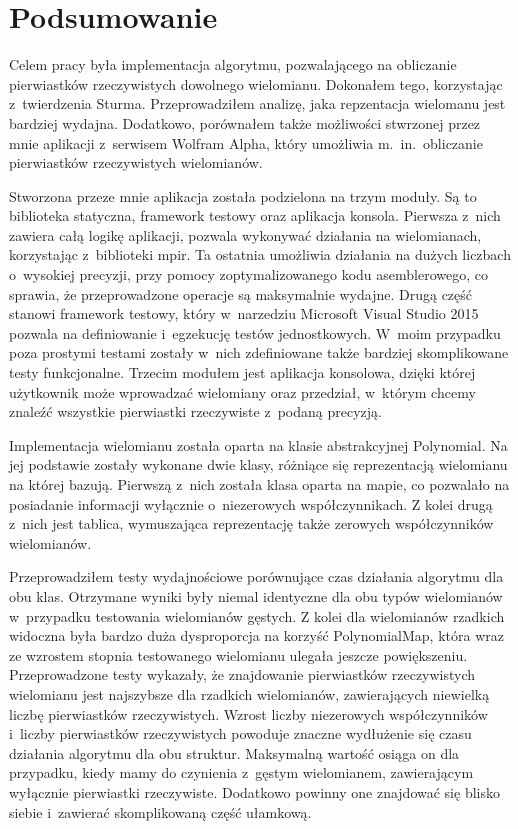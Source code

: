 \chapter{Podsumowanie}

Celem pracy była implementacja algorytmu, pozwalającego na obliczanie pierwiastków rzeczywistych dowolnego wielomianu. Dokonałem tego, korzystając z~twierdzenia Sturma. Przeprowadziłem analizę, jaka repzentacja wielomanu jest bardziej wydajna. Dodatkowo, porównałem także możliwości stwrzonej przez mnie aplikacji z~serwisem Wolfram Alpha, który umożliwia m.\ in.\ obliczanie pierwiastków rzeczywistych wielomianów.

Stworzona przeze mnie aplikacja została podzielona na trzym moduły. Są to biblioteka statyczna, framework testowy oraz aplikacja konsola. Pierwsza z~nich zawiera całą logikę aplikacji, pozwala wykonywać działania na wielomianach, korzystając z~biblioteki mpir. Ta ostatnia umożliwia działania na dużych liczbach o~wysokiej precyzji, przy pomocy zoptymalizowanego kodu asemblerowego, co sprawia, że przeprowadzone operacje są maksymalnie wydajne. Drugą część stanowi framework testowy, który w~narzedziu Microsoft Visual Studio 2015 pozwala na definiowanie i~egzekucję testów jednostkowych. W~moim przypadku poza prostymi testami zostały w~nich zdefiniowane także bardziej skomplikowane testy funkcjonalne. Trzecim modułem jest aplikacja konsolowa, dzięki której użytkownik może wprowadzać wielomiany oraz przedział, w~którym chcemy znaleźć wszystkie pierwiastki rzeczywiste z~podaną precyzją.

Implementacja wielomianu została oparta na klasie abstrakcyjnej Polynomial. Na jej podstawie zostały wykonane dwie klasy, różniące się reprezentacją wielomianu na której bazują. Pierwszą z~nich została klasa oparta na mapie, co pozwalało na posiadanie informacji wyłącznie o~niezerowych współczynnikach. Z kolei drugą z~nich jest tablica, wymuszająca reprezentację także zerowych współczynników wielomianów.

Przeprowadziłem testy wydajnościowe porównujące czas działania algorytmu dla obu klas. Otrzymane wyniki były niemal identyczne dla obu typów wielomianów w~przypadku testowania wielomianów gęstych. Z kolei dla wielomianów rzadkich widoczna była bardzo duża dysproporcja na korzyść PolynomialMap, która wraz ze wzrostem stopnia testowanego wielomianu ulegała jeszcze powiększeniu. Przeprowadzone testy wykazały, że znajdowanie pierwiastków rzeczywistych wielomianu jest najszybsze dla rzadkich wielomianów, zawierających niewielką liczbę pierwiastków rzeczywistych. Wzrost liczby niezerowych współczynników i~liczby pierwiastków rzeczywistych powoduje znaczne wydłużenie się czasu działania algorytmu dla obu struktur. Maksymalną wartość osiąga on dla przypadku, kiedy mamy do czynienia z~gęstym wielomianem, zawierającym wyłącznie pierwiastki rzeczywiste. Dodatkowo powinny one znajdować się blisko siebie i~zawierać skomplikowaną część ułamkową.

